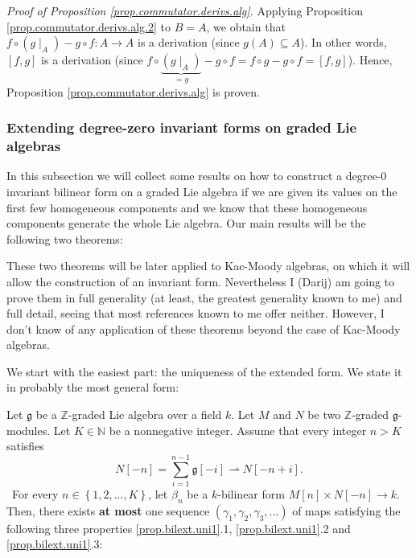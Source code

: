 \documentclass[etingof-lie.tex]{subfiles}
\begin{document}
\begin{verlong}
\textit{Proof of Proposition \ref{prop.commutator.derivs.alg}.} Applying
Proposition \ref{prop.commutator.derivs.alg.2} to $B=A$, we obtain that
$f\circ\left(  g\mid_{A}\right)  -g\circ f:A\rightarrow A$ is a derivation
(since $g\left(  A\right)  \subseteq A$). In other words, $\left[  f,g\right]
$ is a derivation (since $f\circ\underbrace{\left(  g\mid_{A}\right)  }%
_{=g}-g\circ f=f\circ g-g\circ f=\left[  f,g\right]  $). Hence, Proposition
\ref{prop.commutator.derivs.alg} is proven.
\end{verlong}

\protect\begin{noncompile}
\subsubsection{Extending degree-zero invariant forms on graded Lie algebras}

In this subsection we will collect some results on how to construct a
degree-$0$ invariant bilinear form on a graded Lie algebra if we are given its
values on the first few homogeneous components and we know that these
homogeneous components generate the whole Lie algebra. Our main results will
be the following two theorems:

\begin{theorem}
[...][ext]
\end{theorem}

\begin{theorem}
\end{theorem}

These two theorems will be later applied to Kac-Moody algebras, on which it
will allow the construction of an invariant form. Nevertheless I (Darij) am
going to prove them in full generality (at least, the greatest generality
known to me) and full detail, seeing that most references known to me offer
neither. However, I don't know of any application of these theorems beyond the
case of Kac-Moody algebras.

We start with the easiest part: the uniqueness of the extended form. We state
it in probably the most general form:

\begin{proposition}
\label{prop.bilext.uni1}Let $\mathfrak{g}$ be a $\mathbb{Z}$-graded Lie
algebra over a field $k$. Let $M$ and $N$ be two $\mathbb{Z}$-graded
$\mathfrak{g}$-modules. Let $K\in\mathbb{N}$ be a nonnegative integer. Assume
that every integer $n>K$ satisfies%
\begin{equation}
N\left[  -n\right]  =\sum\limits_{i=1}^{n-1}\mathfrak{g}\left[  -i\right]
\rightharpoonup N\left[  -n+i\right]  . \label{prop.bilext.uni1.gen1}%
\end{equation}
\footnotemark\ For every $n\in\left\{  1,2,...,K\right\}  $, let $\beta_{n}$
be a $k$-bilinear form $M\left[  n\right]  \times N\left[  -n\right]
\rightarrow k$. Then, there exists \textbf{at most} one sequence $\left(
\gamma_{1},\gamma_{2},\gamma_{3},...\right)  $ of maps satisfying the
following three properties \ref{prop.bilext.uni1}.1, \ref{prop.bilext.uni1}.2
and \ref{prop.bilext.uni1}.3:


\end{proposition}
\end{noncompile}
\end{document}
